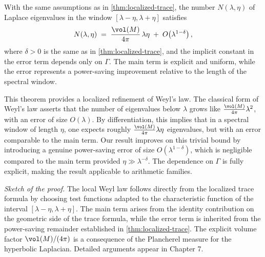 \begin{theorem}\label{thm:local-weyl}
With the same assumptions as in \cref{thm:localized-trace}, the number
$N(\lambda,\eta)$ of Laplace eigenvalues in the window
$[\lambda-\eta,\lambda+\eta]$ satisfies
\[
  N(\lambda,\eta)
  \;=\; \frac{\vol(M)}{4\pi}\,\lambda\eta
  \;+\; O\!\left(\lambda^{1-\delta}\right),
\]
where $\delta>0$ is the same as in \cref{thm:localized-trace}, and the implicit
constant in the error term depends only on $\Gamma$. The main term is explicit
and uniform, while the error represents a power-saving improvement relative to
the length of the spectral window.
\end{theorem}

This theorem provides a localized refinement of Weyl’s law. The classical form
of Weyl’s law asserts that the number of eigenvalues below $\lambda$ grows like
$\frac{\vol(M)}{4\pi}\lambda^2$, with an error of size $O(\lambda)$. By
differentiation, this implies that in a spectral window of length $\eta$, one
expects roughly $\frac{\vol(M)}{4\pi}\lambda\eta$ eigenvalues, but with an
error comparable to the main term. Our result improves on this trivial bound by
introducing a genuine power-saving error of size $O(\lambda^{1-\delta})$, which
is negligible compared to the main term provided $\eta\gg \lambda^{-\delta}$.
The dependence on $\Gamma$ is fully explicit, making the result applicable to
arithmetic families.

\medskip

\noindent \textit{Sketch of the proof.}
The local Weyl law follows directly from the localized trace formula by
choosing test functions adapted to the characteristic function of the interval
$[\lambda-\eta,\lambda+\eta]$. The main term arises from the identity
contribution on the geometric side of the trace formula, while the error term
is inherited from the power-saving remainder established in
\cref{thm:localized-trace}. The explicit volume factor $\vol(M)/(4\pi)$ is a
consequence of the Plancherel measure for the hyperbolic Laplacian. Detailed
arguments appear in Chapter 7.

\medskip

